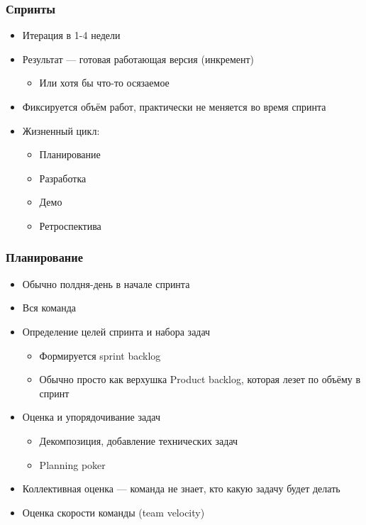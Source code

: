 \documentclass{../../slides-style}
\begin{document}
    \begin{frame}
        \frametitle{Спринты}
        \begin{itemize}
            \item Итерация в 1-4 недели
            \item Результат --- готовая работающая версия (инкремент)
            \begin{itemize}
                \item Или хотя бы что-то осязаемое
            \end{itemize}
            \item Фиксируется объём работ, практически не меняется во время спринта
            \item Жизненный цикл:
            \begin{itemize}
                \item Планирование
                \item Разработка
                \item Демо
                \item Ретроспектива
            \end{itemize}
        \end{itemize}
    \end{frame}

    \begin{frame}
        \frametitle{Планирование}
        \begin{itemize}
            \item Обычно полдня-день в начале спринта
            \item Вся команда
            \item Определение целей спринта и набора задач
            \begin{itemize}
                \item Формируется sprint backlog
                \item Обычно просто как верхушка Product backlog, которая лезет по объёму в спринт
            \end{itemize}
            \item Оценка и упорядочивание задач
            \begin{itemize}
                \item Декомпозиция, добавление технических задач
                \item Planning poker
            \end{itemize}
            \item Коллективная оценка --- команда не знает, кто какую задачу будет делать
            \item Оценка скорости команды (team velocity)
        \end{itemize}
    \end{frame}
\end{document}
